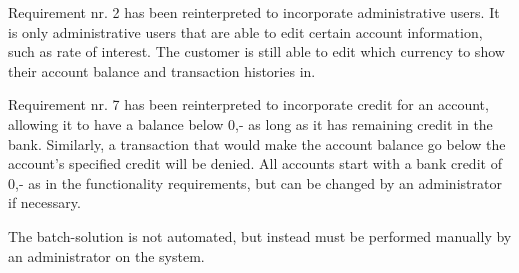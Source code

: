 Requirement nr. 2 has been reinterpreted to incorporate administrative users. It is only administrative users that are able to edit certain account information, such as rate of interest. The customer is still able to edit which currency to show their account balance and transaction histories in.

Requirement nr. 7 has been reinterpreted to incorporate credit for an account, allowing it to have a balance below 0,- as long as it has remaining credit in the bank. Similarly, a transaction that would make the account balance go below the account's specified credit will be denied. All accounts start with a bank credit of 0,- as in the functionality requirements, but can be changed by an administrator if necessary. 

The batch-solution is not automated, but instead must be performed manually by an administrator on the system.

